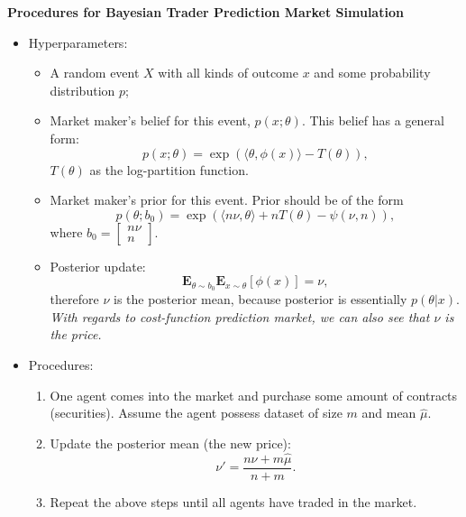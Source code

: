 \documentclass[12pt]{article}
\begin{document}
\begin{center}
    \textbf{\large Procedures for Bayesian Trader Prediction Market Simulation}
\end{center}

\begin{itemize}
    \item Hyperparameters:
          \begin{itemize}[label=$\circ$]
              \item A random event $X$ with all kinds of outcome $x$ and some probability distribution $p$;
              \item Market maker's belief for this event, $p(x;\theta)$. This belief has a general form: \[ p(x;\theta)=\exp\left( \langle\theta,\phi(x)\rangle-T(\theta) \right), \] $T(\theta)$ as the log-partition function.
              \item Market maker's prior for this event. Prior should be of the form \[ p(\theta;b_0)=\exp\left( \langle n\nu,\theta\rangle+nT(\theta)-\psi(\nu,n) \right), \] where $b_0=\begin{bmatrix}
                  n\nu\\n
              \end{bmatrix}$.
              \item Posterior update: \[ \mathbf{E}_{\theta\sim b_0}\mathbf{E}_{x\sim\theta}[\phi(x)]=\nu, \] therefore $\nu$ is the posterior mean, because posterior is essentially $p(\theta|x)$. \textit{With regards to cost-function prediction market, we can also see that $\nu$ is the price.}
          \end{itemize}
    \item Procedures:
          \begin{enumerate}
              \item One agent comes into the market and purchase some amount of contracts (securities). Assume the agent possess dataset of size $m$ and mean $\hat{\mu}$.
              \item Update the posterior mean (the new price): \[\nu'=\frac{n\nu+m\hat{\mu}}{n+m}.\]
              \item Repeat the above steps until all agents have traded in the market.
          \end{enumerate}
\end{itemize}
\end{document}
